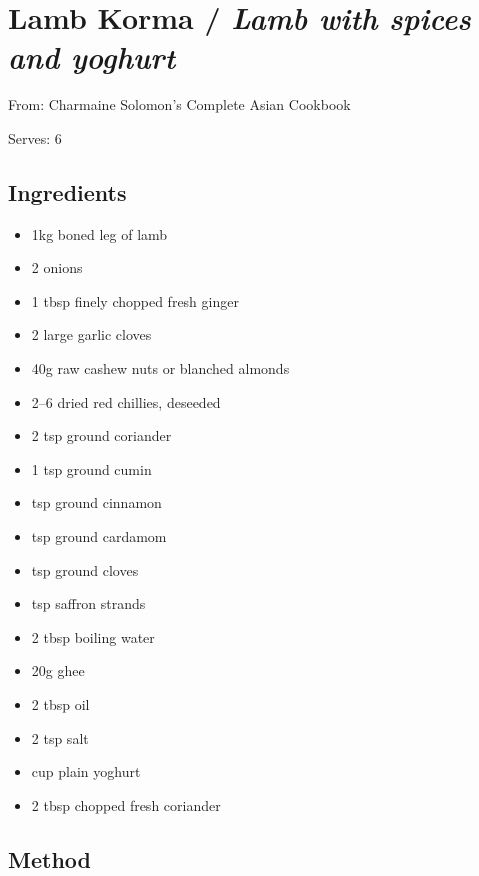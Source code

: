 \section{Lamb Korma / \emph{Lamb with spices and yoghurt}}


From: Charmaine Solomon's Complete Asian Cookbook

Serves: 6

\subsection{Ingredients}

\begin{itemize}
	\item 1kg boned leg of lamb
	\item 2 onions
	\item 1 tbsp finely chopped fresh ginger 
	\item 2 large garlic cloves 
	\item 40g raw cashew nuts or blanched almonds 
	\item 2–6 dried red chillies, deseeded 
	\item 2 tsp ground coriander 
	\item 1 tsp ground cumin 
	\item {} tsp ground cinnamon 
	\item {} tsp ground cardamom 
	\item {} tsp ground cloves 
	\item {} tsp saffron strands 
	\item 2 tbsp boiling water 
	\item 20g ghee 
	\item 2 tbsp oil 
	\item 2 tsp salt 
	\item {} cup plain yoghurt 
	\item 2 tbsp chopped fresh coriander
\end{itemize}

\subsection{Method}


